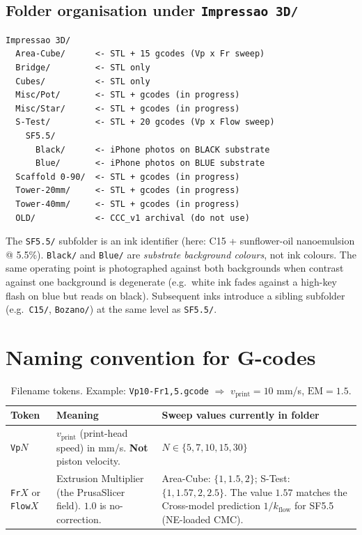 \documentclass[11pt,a4paper]{article}
\begin{document}
\subsection{Folder organisation under \texttt{Impressao 3D/}}

\begin{lstlisting}[style=shell]
Impressao 3D/
  Area-Cube/      <- STL + 15 gcodes (Vp x Fr sweep)
  Bridge/         <- STL only
  Cubes/          <- STL only
  Misc/Pot/       <- STL + gcodes (in progress)
  Misc/Star/      <- STL + gcodes (in progress)
  S-Test/         <- STL + 20 gcodes (Vp x Flow sweep)
    SF5.5/
      Black/      <- iPhone photos on BLACK substrate
      Blue/       <- iPhone photos on BLUE substrate
  Scaffold 0-90/  <- STL + gcodes (in progress)
  Tower-20mm/     <- STL + gcodes (in progress)
  Tower-40mm/     <- STL + gcodes (in progress)
  OLD/            <- CCC_v1 archival (do not use)
\end{lstlisting}

The \texttt{SF5.5/} subfolder is an ink identifier (here:
C15 + sunflower-oil nanoemulsion @ 5.5\%). \texttt{Black/} and
\texttt{Blue/} are \emph{substrate background colours}, not ink
colours. The same operating point is photographed against both
backgrounds when contrast against one background is degenerate
(e.g.\ white ink fades against a high-key flash on blue but reads
on black). Subsequent inks introduce a sibling subfolder
(e.g.\ \texttt{C15/}, \texttt{Bozano/}) at the same level as
\texttt{SF5.5/}.

\section{Naming convention for G-codes}
\label{sec:naming}

\begin{table}[h]
\centering
\small
\begin{tabular}{p{3.4cm} p{4.0cm} p{6.6cm}}
\toprule
Token & Meaning & Sweep values currently in folder \\
\midrule
\texttt{Vp$N$} &
$v_\mathrm{print}$ (print-head speed) in mm/s.
\textbf{Not} piston velocity. &
$N \in \{5, 7, 10, 15, 30\}$ \\
\texttt{Fr$X$} or \texttt{Flow$X$} &
Extrusion Multiplier (the PrusaSlicer field). $1.0$ is
no-correction. &
Area-Cube: $\{1, 1.5, 2\}$; \quad
S-Test: $\{1, 1.57, 2, 2.5\}$. The value $1.57$ matches
the Cross-model prediction $1/k_\mathrm{flow}$ for SF5.5
(NE-loaded CMC). \\
\bottomrule
\end{tabular}
\caption{Filename tokens. Example: \texttt{Vp10-Fr1,5.gcode}
$\Rightarrow$ $v_\mathrm{print}=10$ mm/s, $\mathrm{EM}=1.5$.}
\label{tab:naming}
\end{table}
\end{document}
